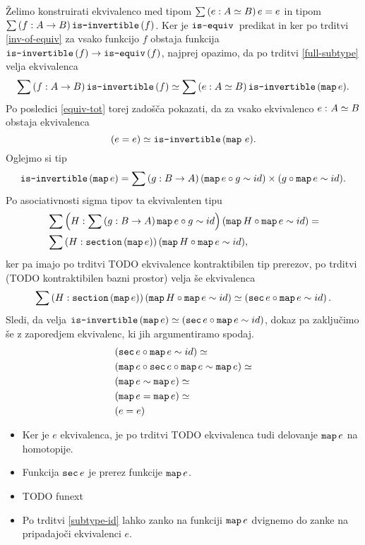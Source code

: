 \begin{dokaz}
  Želimo konstruirati ekvivalenco med tipom \(\sumtype{e}{A \simeq B}{e = e}\) in tipom
  \(\sumtype{f}{A \to B}{\isinv(f)}\).
  Ker je \(\isequiv\) predikat in ker po trditvi \ref{inv-of-equiv}
  za vsako funkcijo \(f\) obstaja funkcija
  \(\typename{is-invertible}(f) \to \typename{is-equiv}(f)\), najprej opazimo, da po
  trditvi \ref{full-subtype} velja ekvivalenca
  \[\sumtype{f}{A \to B}{\isinv(f)} \simeq
    \sumtype{e}{A \simeq B}{\isinv(\map e).}
  \]
  Po posledici \ref{equiv-tot}
  torej zadošča pokazati, da za vsako ekvivalenco \(\dequiv{e}{A}{B}\) obstaja ekvivalenca
  \[(e = e) \simeq \isinv(\map \, e).\]
  Oglejmo si tip \[\isinv(\map e) = \sumtype{g}{B \to A}{(\map e \circ g \sim id) \times (g \circ \map e \sim id)}.\]
  Po asociativnosti sigma tipov ta ekvivalenten tipu
  \begin{align*}
    & \sumtype{H}{\sumtype{g}{B \to A}{\map e \circ g \sim id}}{(\map H \circ \map e \sim id)} = \\
    & \sumtype{H}{\typename{section}(\map e)}{(\map H \circ \map e \sim id)},
  \end{align*}
  ker pa imajo po trditvi TODO ekvivalence kontraktibilen tip prerezov, po trditvi
  (TODO kontraktibilen bazni prostor) velja še ekvivalenca
  \[\sumtype{H}{\typename{section}(\map e)}{(\map H \circ \map e \sim id)} \simeq
    \left(\typename{sec} e \circ \map e \sim id\right).\]
  Sledi, da velja \(\isinv(\map e) \simeq (\typename{sec} e \circ \map e \sim id)\), dokaz pa
  zaključimo še z zaporedjem ekvivalenc, ki jih argumentiramo spodaj.
  \begin{align*}
    & (\typename{sec} e \circ \map e \sim id) \simeq \\
    & (\map e \circ \typename{sec}e \circ \map e \sim \map e) \simeq \\
    & (\map e \sim \map e) \simeq \\
    & (\map e = \map e) \simeq \\
    & (e = e)
  \end{align*}
  \begin{itemize}
  \item Ker je \(e\) ekvivalenca, je po trditvi TODO ekvivalenca tudi delovanje \(\map e\)
    na homotopije.
  \item Funkcija \(\typename{sec}e\) je prerez funkcije \(\map e\).
  \item TODO funext
  \item Po trditvi \ref{subtype-id} lahko zanko na funkciji \(\map e\) dvignemo do
    zanke na pripadajoči ekvivalenci \(e\).
  \end{itemize}
\end{dokaz}


